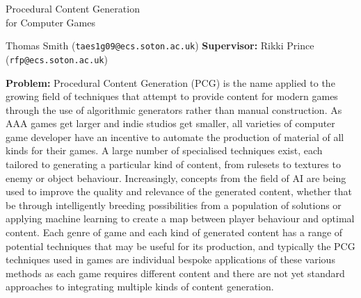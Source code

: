 \documentclass[12pt]{article}
\date{}
\begin{document}
\begin{center}
{\LARGE Procedural Content Generation\\[0.25cm] for Computer Games}


Thomas Smith (\texttt{taes1g09@ecs.soton.ac.uk})\linebreak
{\bf Supervisor:} Rikki Prince (\texttt{rfp@ecs.soton.ac.uk})
\end{center}

{\bf Problem:} Procedural Content Generation (PCG) is the name applied to the growing field of techniques that attempt to provide content for modern games through the use of algorithmic generators rather than manual construction. As AAA games get larger and indie studios get smaller, all varieties of computer game developer have an incentive to automate the production of material of all kinds for their games. A large number of specialised techniques exist, each tailored to generating a particular kind of content, from rulesets to textures to enemy or object behaviour. Increasingly, concepts from the field of AI are being used to improve the quality and relevance of the generated content, whether that be through intelligently breeding possibilities from a population of solutions or applying machine learning to create a map between player behaviour and optimal content. Each genre of game and each kind of generated content has a range of potential techniques that may be useful for its production, and typically the PCG techniques used in games are individual bespoke applications of these various methods as each game requires different content and there are not yet standard approaches to integrating multiple kinds of content generation.


\end{document}
